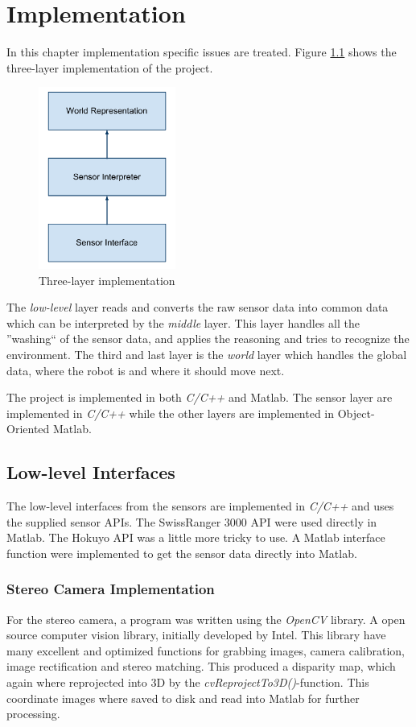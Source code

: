 
\chapter{Implementation}
In this chapter implementation specific issues are treated. Figure
\ref{chap6:fig-implementation} shows the three-layer implementation of the project.
\begin{figure}[htbp]
    \centering
    \includegraphics[width=0.4\textwidth]{pics/implementation}
    \caption{Three-layer implementation}
    \label{chap6:fig-implementation}
\end{figure}
The \emph{low-level} layer reads and converts the raw sensor data into common data which can be
interpreted by the \emph{middle} layer. This layer handles all the ''washing`` of the
sensor data, and applies the reasoning and tries to recognize the environment. The third
and last layer is the \emph{world} layer which handles the global data, where the robot is
and where it should move next. 

The project is implemented in both \emph{C/C++} and Matlab. The sensor layer are
implemented in \emph{C/C++} while the other layers are implemented in Object-Oriented
Matlab. 

\section{Low-level Interfaces}
The low-level interfaces from the sensors are implemented in \emph{C/C++} and uses the
supplied sensor APIs. The SwissRanger 3000 API were used directly in Matlab. The Hokuyo
API was a little more tricky to use. A Matlab interface function were implemented to get
the sensor data directly into Matlab.

\subsection{Stereo Camera Implementation}
For the stereo camera, a program was written using the \emph{OpenCV} library. A open
source computer vision library, initially developed by Intel. This library have many
excellent and optimized functions for grabbing images, camera calibration, image rectification
and stereo matching. This produced a disparity map, which again where reprojected into 3D
by the \emph{cvReprojectTo3D()}-function. This coordinate images where saved to disk and
read into Matlab for further processing. 


